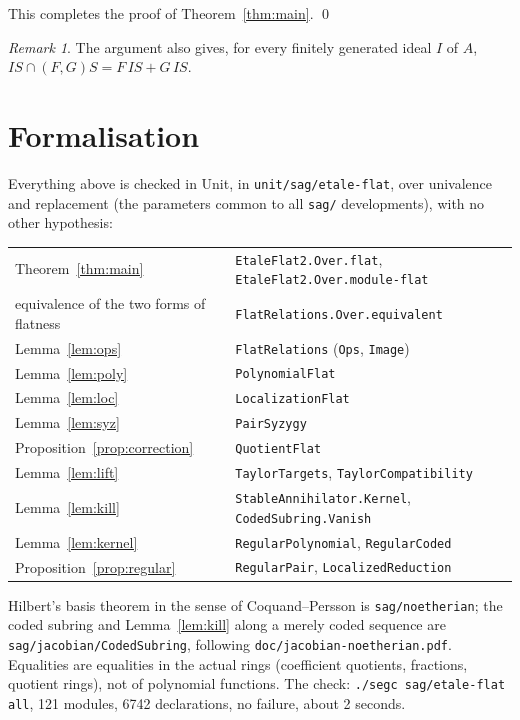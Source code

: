 \documentclass[11pt]{amsart}
\theoremstyle{definition}
\theoremstyle{remark}
\newtheorem{remark}[theorem]{Remark}
\newcommand{\code}[1]{\texttt{#1}}
\begin{document}
This completes the proof of Theorem~\ref{thm:main}. \qed

\begin{remark}
The argument also gives, for every finitely generated ideal $I$ of $A$,
$IS\cap(F,G)S=F\,IS+G\,IS$.
\end{remark}

\section{Formalisation}

Everything above is checked in Unit, in \code{unit/sag/etale-flat}, over
univalence and replacement (the parameters common to all \code{sag/}
developments), with no other hypothesis:
\begin{center}
\begin{tabular}{ll}
Theorem~\ref{thm:main} & \code{EtaleFlat2.Over.flat}, \code{EtaleFlat2.Over.module-flat}\\
equivalence of the two forms of flatness & \code{FlatRelations.Over.equivalent}\\
Lemma~\ref{lem:ops} & \code{FlatRelations} (\code{Ops}, \code{Image})\\
Lemma~\ref{lem:poly} & \code{PolynomialFlat}\\
Lemma~\ref{lem:loc} & \code{LocalizationFlat}\\
Lemma~\ref{lem:syz} & \code{PairSyzygy}\\
Proposition~\ref{prop:correction} & \code{QuotientFlat}\\
Lemma~\ref{lem:lift} & \code{TaylorTargets}, \code{TaylorCompatibility}\\
Lemma~\ref{lem:kill} & \code{StableAnnihilator.Kernel}, \code{CodedSubring.Vanish}\\
Lemma~\ref{lem:kernel} & \code{RegularPolynomial}, \code{RegularCoded}\\
Proposition~\ref{prop:regular} & \code{RegularPair}, \code{LocalizedReduction}
\end{tabular}
\end{center}
Hilbert's basis theorem in the sense of Coquand--Persson is
\code{sag/noetherian}; the coded subring and Lemma~\ref{lem:kill} along a
merely coded sequence are \code{sag/jacobian/CodedSubring}, following
\code{doc/jacobian-noetherian.pdf}. Equalities are equalities in the actual
rings (coefficient quotients, fractions, quotient rings), not of polynomial
functions. The check: \code{./segc sag/etale-flat all}, 121 modules,
6742 declarations, no failure, about 2 seconds.
\end{document}
